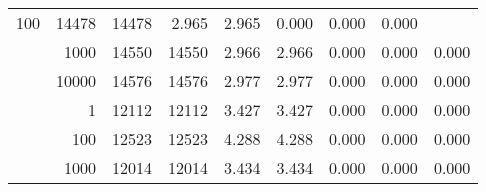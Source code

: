 \begin{table}
\begin{tabular}{rrrrrrrrr}
					\multirow{ 1 }{*}{ 100 } &
					
						
							    
							     14478  & 14478  
	                           & 2.965 & 2.965 & 0.000
	                           & 0.000 & 0.000  \\
	                
	            
					 &  
					 
					\multirow{ 1 }{*}{ 1000 } &
					
						
							    
							     14550  & 14550  
	                           & 2.966 & 2.966 & 0.000
	                           & 0.000 & 0.000  \\
	                
	            
					 &  
					 
					\multirow{ 1 }{*}{ 10000 } &
					
						
							    
							     14576  & 14576  
	                           & 2.977 & 2.977 & 0.000
	                           & 0.000 & 0.000  \\
	                
	            
	        
				\noalign{\smallskip}\hline
				\multirow{ 4 }{*}{ 250000 } &
				
					
					 
					\multirow{ 1 }{*}{ 1 } &
					
						
							    
							     12112  & 12112  
	                           & 3.427 & 3.427 & 0.000
	                           & 0.000 & 0.000  \\
	                
	            
					 &  
					 
					\multirow{ 1 }{*}{ 100 } &
					
						
							    
							     12523  & 12523  
	                           & 4.288 & 4.288 & 0.000
	                           & 0.000 & 0.000  \\
	                
	            
					 &  
					 
					\multirow{ 1 }{*}{ 1000 } &
					
						
							    
							     12014  & 12014  
	                           & 3.434 & 3.434 & 0.000
	                           & 0.000 & 0.000  \\
	                

\end{tabular}
\end{table}
